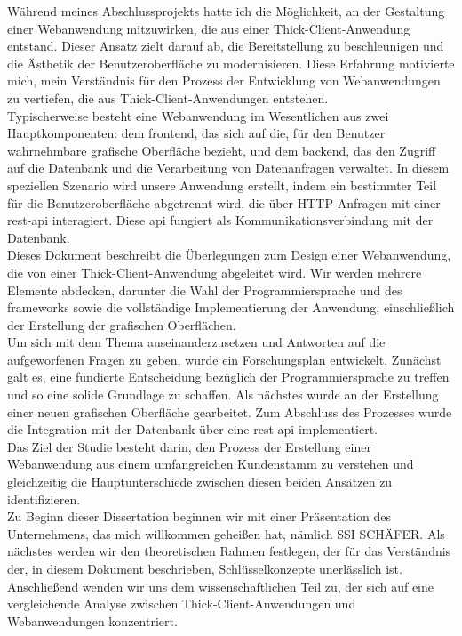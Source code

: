 \documentclass[a4paper, 12pt, french]{article}
\begin{document}
		Während meines Abschlussprojekts hatte ich die Möglichkeit, an der Gestaltung einer Webanwendung mitzuwirken, die aus einer Thick-Client-Anwendung entstand. Dieser Ansatz zielt darauf ab, die Bereitstellung zu beschleunigen und die Ästhetik der Benutzeroberfläche zu modernisieren. Diese Erfahrung motivierte mich, mein Verständnis für den Prozess der Entwicklung von Webanwendungen zu vertiefen, die aus Thick-Client-Anwendungen entstehen.\\
		
		Typischerweise besteht eine Webanwendung im Wesentlichen aus zwei Hauptkomponenten: dem \Gls{frontend}, das sich auf die, für den Benutzer wahrnehmbare grafische Oberfläche bezieht, und dem \Gls{backend}, das den Zugriff auf die Datenbank und die Verarbeitung von Datenanfragen verwaltet. In diesem speziellen Szenario wird unsere Anwendung erstellt,  indem ein bestimmter Teil für die Benutzeroberfläche abgetrennt wird, die über HTTP-Anfragen mit einer \acrshort{rest}-\acrshort{api} interagiert. Diese \acrshort{api} fungiert als Kommunikationsverbindung mit der Datenbank.\\
		
		Dieses Dokument beschreibt die Überlegungen zum Design einer Webanwendung, die von einer Thick-Client-Anwendung abgeleitet wird. Wir werden mehrere Elemente abdecken, darunter die Wahl der Programmiersprache und des \Glspl{framework} sowie die vollständige Implementierung der Anwendung, einschließlich der Erstellung der grafischen Oberflächen.\\
		
Um sich mit dem Thema auseinanderzusetzen und Antworten auf die aufgeworfenen Fragen zu geben, wurde ein Forschungsplan entwickelt. Zunächst galt es, eine fundierte Entscheidung bezüglich der Programmiersprache zu treffen und so eine solide Grundlage zu schaffen. Als nächstes wurde an der Erstellung einer neuen grafischen Oberfläche gearbeitet. Zum Abschluss des Prozesses wurde die Integration mit der Datenbank über eine \acrshort{rest}-\acrshort{api} implementiert.\\
		
		Das Ziel der Studie besteht darin, den Prozess der Erstellung einer Webanwendung aus einem umfangreichen Kundenstamm zu verstehen und gleichzeitig die Hauptunterschiede zwischen diesen beiden Ansätzen zu identifizieren.\\
		
		Zu Beginn dieser Dissertation beginnen wir mit einer Präsentation des Unternehmens, das mich willkommen geheißen hat, nämlich SSI SCHÄFER. Als nächstes werden wir den theoretischen Rahmen festlegen, der für das Verständnis der, in diesem Dokument beschrieben, Schlüsselkonzepte unerlässlich ist. Anschließend wenden wir uns dem wissenschaftlichen Teil zu, der sich auf eine vergleichende Analyse zwischen Thick-Client-Anwendungen und Webanwendungen konzentriert.\\
\end{document}
